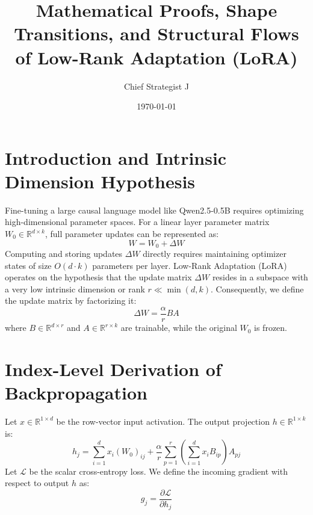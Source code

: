 \documentclass{article}
\begin{document}
\title{\textbf{Mathematical Proofs, Shape Transitions, and Structural Flows of Low-Rank Adaptation (LoRA)}}
\author{Chief Strategist J}
\date{\today}
\maketitle

\section{Introduction and Intrinsic Dimension Hypothesis}
Fine-tuning a large causal language model like Qwen2.5-0.5B requires optimizing high-dimensional parameter spaces. For a linear layer parameter matrix $W_0 \in \mathbb{R}^{d \times k}$, full parameter updates can be represented as:
\begin{equation}
    W = W_0 + \Delta W
\end{equation}
Computing and storing updates $\Delta W$ directly requires maintaining optimizer states of size $O(d \cdot k)$ parameters per layer. Low-Rank Adaptation (LoRA) operates on the hypothesis that the update matrix $\Delta W$ resides in a subspace with a very low intrinsic dimension or rank $r \ll \min(d, k)$. Consequently, we define the update matrix by factorizing it:
\begin{equation}
    \Delta W = \frac{\alpha}{r} B A
\end{equation}
where $B \in \mathbb{R}^{d \times r}$ and $A \in \mathbb{R}^{r \times k}$ are trainable, while the original $W_0$ is frozen.

\section{Index-Level Derivation of Backpropagation}
Let $x \in \mathbb{R}^{1 \times d}$ be the row-vector input activation. The output projection $h \in \mathbb{R}^{1 \times k}$ is:
\begin{equation}
    h_j = \sum_{i=1}^d x_i (W_0)_{ij} + \frac{\alpha}{r} \sum_{p=1}^r \left( \sum_{i=1}^d x_i B_{ip} \right) A_{pj}
\end{equation}
Let $\mathcal{L}$ be the scalar cross-entropy loss. We define the incoming gradient with respect to output $h$ as:
\begin{equation}
    g_j = \frac{\partial \mathcal{L}}{\partial h_j}
\end{equation}
\end{document}
